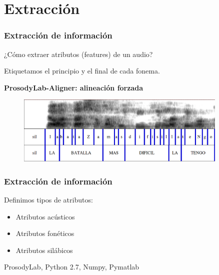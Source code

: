 \documentclass[mathserif]{beamer}%
\begin{document}
\section{Extracción}

\begin{frame}
	\frametitle{Extracción de información}
	
	¿Cómo extraer atributos (features) de un audio?
	
	Etiquetamos el principio y el final de cada fonema.
	
	\begin{center}
			\textbf{ProsodyLab-Aligner: alineación forzada}
	\end{center}
	
	\begin{figure}[h!]
		\centerline{\includegraphics[width=0.9\textwidth]{espectrograma_u3_t33_a1} }
	\end{figure}
\end{frame}

\begin{frame}
	\frametitle{Extracción de información}
	Definimos tipos de atributos:
	\begin{itemize}\itemsep=2ex
		\item Atributos acústicos
		\item Atributos fonéticos
		\item Atributos silábicos
	\end{itemize}
	{\tiny ProsodyLab, Python 2.7, Numpy, Pymatlab}
	
\end{frame}

%		
%	
\end{document}
